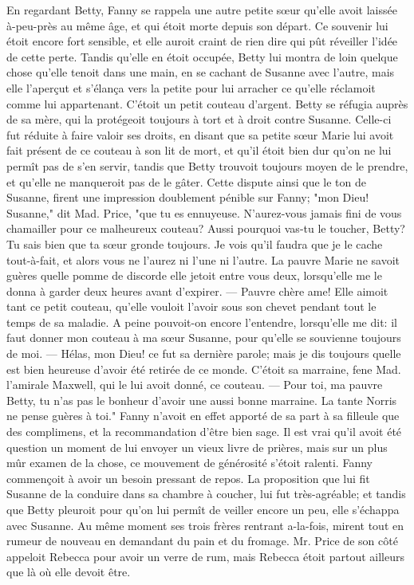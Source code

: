 En regardant Betty, Fanny se rappela une autre petite sœur qu’elle avoit laissée à-peu-près au même âge, et qui étoit morte depuis son départ. Ce souvenir lui étoit encore fort sensible, et elle auroit craint de rien dire qui pût réveiller l’idée de cette perte. Tandis qu’elle en étoit occupée, Betty lui montra de loin quelque chose qu’elle tenoit dans une main, en se cachant de Susanne avec l’autre, mais elle l’aperçut et s’élança vers la petite pour lui arracher ce qu’elle réclamoit comme lui appartenant. C’étoit un petit couteau d’argent. Betty se réfugia auprès de sa mère, qui la protégeoit toujours à tort et à droit contre Susanne. Celle-ci fut réduite à faire valoir ses droits, en disant que sa petite sœur Marie lui avoit fait présent de ce couteau à son lit de mort, et qu’il étoit bien dur qu’on ne lui permît pas de s’en servir, tandis que Betty trouvoit toujours moyen de le prendre, et qu’elle ne manqueroit pas de le gâter. Cette dispute\setcounter{page}{393} ainsi que le ton de Susanne, firent une impression doublement pénible sur Fanny; "mon Dieu! Susanne," dit Mad. Price, "que tu es ennuyeuse. N'aurez-vous jamais fini de vous chamailler pour ce malheureux couteau? Aussi pourquoi vas-tu le toucher, Betty? Tu sais bien que ta sœur gronde toujours. Je vois qu'il faudra que je le cache tout-à-fait, et alors vous ne l'aurez ni l'une ni l'autre. La pauvre Marie ne savoit guères quelle pomme de discorde elle jetoit entre vous deux, lorsqu'elle me le donna à garder deux heures avant d'expirer. — Pauvre chère ame! Elle aimoit tant ce petit couteau, qu'elle vouloit l'avoir sous son chevet pendant tout le temps de sa maladie. A peine pouvoit-on encore l'entendre, lorsqu'elle me dit: il faut donner mon couteau à ma sœur Susanne, pour qu'elle se souvienne toujours de moi. — Hélas, mon Dieu! ce fut sa dernière parole; mais je dis toujours quelle est bien heureuse d'avoir été retirée de ce monde. C'étoit sa marraine, fene Mad. l'amirale Maxwell, qui le lui avoit donné, ce couteau. — Pour toi, ma pauvre Betty, tu n'as pas le bonheur d'avoir une aussi bonne marraine. La tante Norris ne pense guères à toi."
Fanny n'avoit en effet apporté de sa part\setcounter{page}{394} à sa filleule que des complimens, et la recommandation d'être bien sage. Il est vrai qu'il avoit été question un moment de lui envoyer un vieux livre de prières, mais sur un plus mûr examen de la chose, ce mouvement de générosité s'étoit ralenti.
Fanny commençoit à avoir un besoin pressant de repos. La proposition que lui fit Susanne de la conduire dans sa chambre à coucher, lui fut très-agréable; et tandis que Betty pleuroit pour qu'on lui permît de veiller encore un peu, elle s'échappa avec Susanne. Au même moment ses trois frères rentrant a-la-fois, mirent tout en rumeur de nouveau en demandant du pain et du fromage. Mr. Price de son côté appeloit Rebecca pour avoir un verre de rum, mais Rebecca étoit partout ailleurs que là où elle devoit être.
